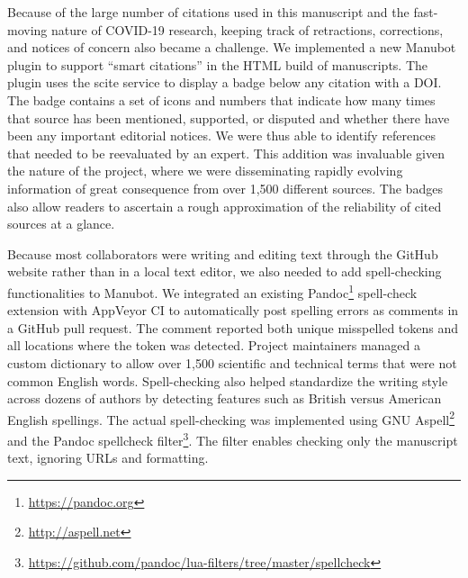 \documentclass[twocolumn]{ceurart}
\begin{document}
Because of the large number of citations used in this manuscript and the fast-moving nature of COVID-19 research, keeping track of retractions, corrections, and notices of concern also became a challenge.
We implemented a new Manubot plugin to support ``smart citations'' in the HTML build of manuscripts.
The plugin uses the scite \citep{14UJbLWf4} service to display a badge below any citation with a DOI.
The badge contains a set of icons and numbers that indicate how many times that source has been mentioned, supported, or disputed and whether there have been any important editorial notices.
We were thus able to identify references that needed to be reevaluated by an expert.
This addition was invaluable given the nature of the project, where we were disseminating rapidly evolving information of great consequence from over 1,500 different sources.
The badges also allow readers to ascertain a rough approximation of the reliability of cited sources at a glance.

Because most collaborators were writing and editing text through the GitHub website rather than in a local text editor, we also needed to add spell-checking functionalities to Manubot.
We integrated an existing Pandoc\footnote{\url{https://pandoc.org}} spell-check extension with AppVeyor CI to automatically post spelling errors as comments in a GitHub pull request.
The comment reported both unique misspelled tokens and all locations where the token was detected.
Project maintainers managed a custom dictionary to allow over 1,500 scientific and technical terms that were not common English words.
Spell-checking also helped standardize the writing style across dozens of authors by detecting features such as British versus American English spellings.
The actual spell-checking was implemented using GNU Aspell\footnote{\url{http://aspell.net}} and the Pandoc spellcheck filter\footnote{\url{https://github.com/pandoc/lua-filters/tree/master/spellcheck}}.
The filter enables checking only the manuscript text, ignoring URLs and formatting.
\end{document}
